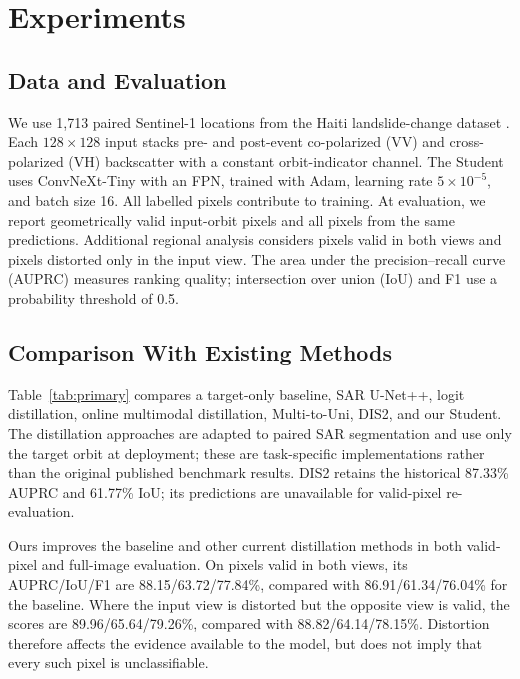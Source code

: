 \section{Experiments}
\label{sec:experiments}
\subsection{Data and Evaluation}
We use 1,713 paired Sentinel-1 locations from the Haiti landslide-change dataset \cite{Bralet2024DataPort,Bralet2024}. Each $128\times128$ input stacks pre- and post-event co-polarized (VV) and cross-polarized (VH) backscatter with a constant orbit-indicator channel. The Student uses ConvNeXt-Tiny with an FPN, trained with Adam, learning rate $5\times10^{-5}$, and batch size 16. All labelled pixels contribute to training. At evaluation, we report geometrically valid input-orbit pixels and all pixels from the same predictions. Additional regional analysis considers pixels valid in both views and pixels distorted only in the input view. The area under the precision--recall curve (AUPRC) measures ranking quality; intersection over union (IoU) and F1 use a probability threshold of 0.5.

\subsection{Comparison With Existing Methods}
Table~\ref{tab:primary} compares a target-only baseline, SAR U-Net++, logit distillation, online multimodal distillation, Multi-to-Uni, DIS2, and our Student. The distillation approaches are adapted to paired SAR segmentation and use only the target orbit at deployment; these are task-specific implementations rather than the original published benchmark results. DIS2 retains the historical 87.33\% AUPRC and 61.77\% IoU; its predictions are unavailable for valid-pixel re-evaluation.

Ours improves the baseline and other current distillation methods in both valid-pixel and full-image evaluation. On pixels valid in both views, its AUPRC/IoU/F1 are 88.15/63.72/77.84\%, compared with 86.91/61.34/76.04\% for the baseline. Where the input view is distorted but the opposite view is valid, the scores are 89.96/65.64/79.26\%, compared with 88.82/64.14/78.15\%. Distortion therefore affects the evidence available to the model, but does not imply that every such pixel is unclassifiable.

